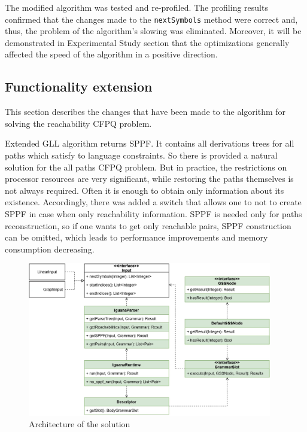 The modified algorithm was tested and re-profiled. The profiling results confirmed that the changes made to the \texttt{nextSymbols} method were correct and, thus, the problem of the algorithm's slowing was eliminated. Moreover, it will be demonstrated in Experimental Study section that the optimizations generally affected the speed of the algorithm in a positive direction.

\subsection{Functionality extension}
This section describes the changes that have been made to the algorithm for solving the reachability CFPQ problem.

Extended GLL algorithm returns SPPF. It contains all derivations trees for all paths which satisfy to language constraints. So there is provided a natural solution for the all paths CFPQ problem. But in practice, the restrictions on processor resources are very significant, while restoring the paths themselves is not always required. Often it is enough to obtain only information about its existence. Accordingly, there was added a switch that allows one to not to create SPPF in case when only reachability information. SPPF is needed only for paths reconstruction, so if one wants to get only reachable pairs, SPPF construction can be omitted, which leads to performance improvements and memory consumption decreasing.

\begin{figure}[ht]
    \centering
    \includegraphics[width=0.95\textwidth]{figures/sppf_arch.jpg}
    \caption{Architecture of the solution}
    \label{fig:solution_architecture}
\end{figure}

